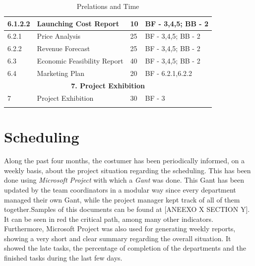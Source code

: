 \begin{longtable}{ | p{1.3cm} | p{5cm} | p{3cm} | p{3.5cm} |}
6.1.2.2 & Launching Cost Report  & 10 & BF - 3,4,5; BB - 2 \\ \hline
6.2.1 & Price Analysis & 25 & BF - 3,4,5; BB - 2 \\ \hline
6.2.2 & Revenue Forecast & 25 & BF - 3,4,5; BB - 2 \\ \hline
6.3 & Economic Feasibility Report & 40 & BF - 3,4,5; BB - 2  \\ \hline
6.4 & Marketing Plan & 20 & BF - 6.2.1,6.2.2 \\ \hline
\multicolumn{4}{|c|}{\textbf{7. Project Exhibition}} \\ \hline
7 & Project Exhibition &30 & BF - 3 \\ \hline
\caption{Prelations and Time} \\
\end{longtable}

\section{Scheduling}
Along the past four months, the costumer has been periodically informed, on a weekly basis, about the project situation regarding the scheduling. This has been done using \textit{Microsoft Project} with which a \textit{Gant} was done. This Gant has been updated by the team coordinators in a modular way since every department managed their own Gant, while the project manager kept track of all of them together.Samples of this documents can be found at [{ANEEXO X SECTION Y}]. It can be seen in red the critical path, among many other indicators. Furthermore, Microsoft Project was also used for generating weekly reports, showing a very short and clear summary regarding the overall situation. It showed the late tasks, the percentage of completion of the departments and the finished tasks during the last few days.